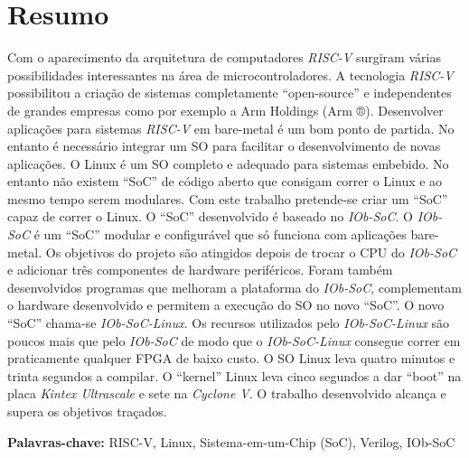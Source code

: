 \cleardoubleoddpage

\chapter*{Resumo}
\thispagestyle{empty} %

Com o aparecimento da arquitetura de computadores \textit{RISC-V} surgiram várias possibilidades interessantes na área de microcontroladores. A tecnologia \textit{RISC-V} possibilitou a criação de sistemas completamente “open-source” e independentes de grandes empresas como por exemplo a Arm Holdings (Arm ®). Desenvolver aplicações para sistemas \textit{RISC-V} em bare-metal é um bom ponto de partida. No entanto é necessário integrar um SO para facilitar o desenvolvimento de novas aplicações. O Linux é um SO completo e adequado para sistemas embebido. No entanto não existem “SoC” de código aberto que consigam correr o Linux e ao mesmo tempo serem modulares. 
%
Com este trabalho pretende-se criar um “SoC” capaz de correr o Linux. O “SoC” desenvolvido é baseado no \textit{IOb-SoC}. O \textit{IOb-SoC} é um “SoC” modular e configurável que só funciona com aplicações bare-metal. Os objetivos do projeto são atingidos depois de trocar o CPU do \textit{IOb-SoC} e adicionar três componentes de hardware periféricos. Foram também desenvolvidos programas que melhoram a plataforma do \textit{IOb-SoC}, complementam o hardware desenvolvido e permitem a execução do SO no novo “SoC”. O novo “SoC” chama-se \textit{IOb-SoC-Linux}. 
%
Os recursos utilizados pelo \textit{IOb-SoC-Linux} são poucos mais que pelo \textit{IOb-SoC} de modo que o \textit{IOb-SoC-Linux} consegue correr em praticamente qualquer FPGA de baixo custo. O SO Linux leva quatro minutos e trinta segundos a compilar. O “kernel” Linux leva cinco segundos a dar “boot” na placa \textit{Kintex Ultrascale} e sete na \textit{Cyclone V}. O trabalho desenvolvido alcança e supera os objetivos traçados. 

\vfill

\textbf{\Large Palavras-chave:} RISC-V, Linux, Sistema-em-um-Chip (SoC), Verilog, IOb-SoC

